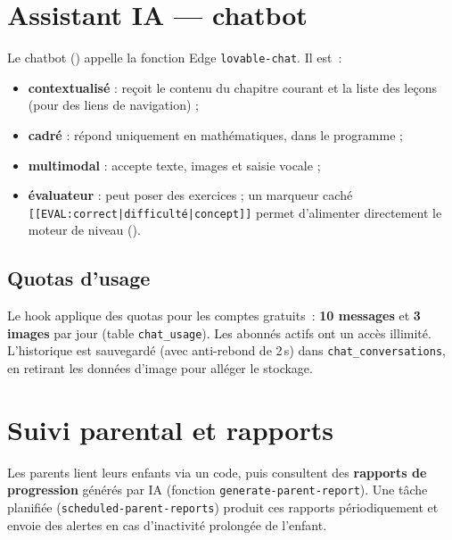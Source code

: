 \section{Assistant IA --- chatbot}
Le chatbot () appelle la fonction Edge
\texttt{lovable-chat}. Il est~:
\begin{itemize}
  \item \textbf{contextualisé} : reçoit le contenu du chapitre courant et la liste
        des leçons (pour des liens de navigation) ;
  \item \textbf{cadré} : répond uniquement en mathématiques, dans le programme ;
  \item \textbf{multimodal} : accepte texte, images et saisie vocale ;
  \item \textbf{évaluateur} : peut poser des exercices ; un marqueur caché
        \texttt{[[EVAL:correct|difficulté|concept]]} permet d'alimenter
        directement le moteur de niveau ().
\end{itemize}

\subsection{Quotas d'usage}
Le hook  applique des quotas pour les comptes
gratuits~: \textbf{10 messages} et \textbf{3 images} par jour (table
\texttt{chat\_usage}). Les abonnés actifs ont un accès illimité. L'historique est
sauvegardé (avec anti-rebond de 2\,s) dans \texttt{chat\_conversations}, en
retirant les données d'image pour alléger le stockage.

\section{Suivi parental et rapports}
Les parents lient leurs enfants via un code, puis consultent des
\textbf{rapports de progression} générés par IA (fonction
\texttt{generate-parent-report}). Une tâche planifiée
(\texttt{scheduled-parent-reports}) produit ces rapports périodiquement et
envoie des alertes en cas d'inactivité prolongée de l'enfant.
